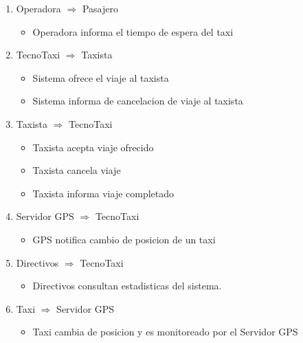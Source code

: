 \begin{enumerate}
    \item Operadora $\Rightarrow$ Pasajero
    \begin{itemize}
        \item Operadora informa el tiempo de espera del taxi
    \end{itemize}

    \item TecnoTaxi $\Rightarrow$ Taxista
    \begin{itemize}
        \item Sistema ofrece el viaje al taxista
        \item Sistema informa de cancelacion de viaje al taxista
    \end{itemize}

    \item Taxista $\Rightarrow$ TecnoTaxi
    \begin{itemize}
         \item Taxista acepta viaje ofrecido
         \item Taxista cancela viaje
         \item Taxista informa viaje completado
     \end{itemize}

    \item Servidor GPS $\Rightarrow$ TecnoTaxi
    \begin{itemize}
        \item GPS notifica cambio de posicion de un taxi
    \end{itemize}	

    \item Directivos $\Rightarrow$ TecnoTaxi
    \begin{itemize}
        \item Directivos consultan estadisticas del sistema.
    \end{itemize} 

    \item Taxi $\Rightarrow$ Servidor GPS
    \begin{itemize}
        \item Taxi cambia de posicion y es monitoreado por el Servidor GPS
    \end{itemize} 
\end{enumerate}


